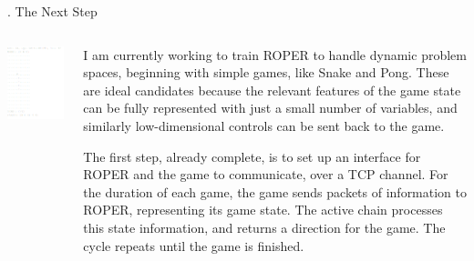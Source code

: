 \documentclass[9pt]{beamer}
\begin{document}
\begin{frame}{\theframenumber. The Next Step}
  \begin{columns}
    \begin{column}{.3\textwidth}
      \includegraphics[height=.75\textheight]{../images/snek.png}
    \end{column}
    \begin{column}{.7\textwidth}
      I am currently working to train ROPER to handle dynamic problem spaces, beginning with simple games, like Snake and Pong. These are ideal candidates because the relevant features of the game state can be fully represented with just a small number of variables, and similarly low-dimensional controls can be sent back to the game.
      \vspace{8pt}

      The first step, already complete, is to set up an interface for ROPER and the game to communicate, over a TCP channel. For the duration of each game, the game sends packets of information to ROPER, representing its game state. The active chain processes this state information, and returns a direction for the game. The cycle repeats until the game is finished.

    \end{column}
  \end{columns}
\end{frame}
\end{document}
